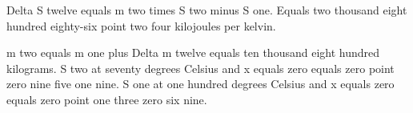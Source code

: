 Delta S twelve equals m two times S two minus S one.  
Equals two thousand eight hundred eighty-six point two four kilojoules per kelvin.  

m two equals m one plus Delta m twelve equals ten thousand eight hundred kilograms.  
S two at seventy degrees Celsius and x equals zero equals zero point zero nine five one nine.  
S one at one hundred degrees Celsius and x equals zero equals zero point one three zero six nine.